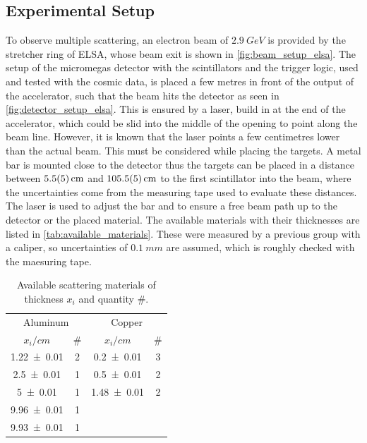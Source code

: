 \documentclass[sn-mathphys-num,iicol]{sn-jnl}
\theoremstyle{thmstyleone}
\theoremstyle{thmstyletwo}
\theoremstyle{thmstylethree}
\begin{document}
\subsection{Experimental Setup}
To observe multiple scattering, an electron beam of $\SI{2.9}{GeV}$ is provided by the stretcher ring of ELSA, whose beam exit is shown in \autoref{fig:beam_setup_elsa}. 
The setup of the micromegas detector with the scintillators and the trigger logic, used and tested with the cosmic data, is placed a few metres in front of the output of the accelerator, such that the beam hits the detector as seen in \autoref{fig:detector_setup_elsa}. 
This is ensured by a laser, build in at the end of the accelerator, which could be slid into the middle of the opening to point along the beam line. 
However, it is known that the laser points a few centimetres lower than the actual beam. 
This must be considered while placing the targets.
A metal bar is mounted close to the detector thus the targets can be placed in a distance between $\SI{5.5\pm 0.5}{cm}$ and $\SI{105.5\pm 0.5}{cm}$ to the first scintillator into the beam, where the uncertainties come from the measuring tape used to evaluate these distances. 
The laser is used to adjust the bar and to ensure a free beam path up to the detector or the placed material.
The available materials with their thicknesses are listed in \autoref{tab:available_materials}. 
These were measured by a previous group with a caliper, so uncertainties of $\SI{0.1}{mm}$ are assumed, which is roughly checked with the maesuring tape.


\begin{table}\centering
  \renewcommand*{\arraystretch}{1.1}
  \begin{tabular}{c|c||c|c}
    \multicolumn{2}{c||}{Aluminum} & \multicolumn{2}{c}{Copper} \\
    {\fontsize{8}{3}\selectfont $x_i/\si{cm}$} & {\fontsize{8}{3}\selectfont \#} & {\fontsize{8}{3}\selectfont $x_i/\si{cm}$} & {\fontsize{8}{3}\selectfont \# } \\\hline \rule{0pt}{3ex}
    \num{1.22\pm 0.01} & 2 & \num{0.2\pm 0.01} & 3 \\
    \num{2.5\pm 0.01} & 1 & \num{0.5\pm 0.01} & 2 \\
    \num{5\pm 0.01} & 1 & \num{1.48\pm 0.01} & 2 \\
    \num{9.96\pm 0.01} & 1 & & \\
    \num{9.93\pm 0.01} & 1 & & \\
  \end{tabular}\vspace{3mm}
  \caption{Available scattering materials of thickness $x_i$ and quantity $\#$.}
  \label{tab:available_materials}
\end{table}
\end{document}
